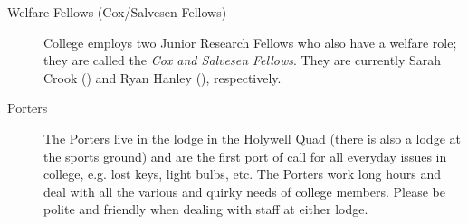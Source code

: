 \begin{description}
\item[Welfare Fellows (Cox/Salvesen Fellows)]
College employs two Junior Research Fellows who also have a welfare role; they
are called the \emph{Cox and Salvesen Fellows}. They are currently Sarah Crook (\href{mailto:sarah.crook@new.ox.ac.uk}{}) and Ryan Hanley (\href{mailto:ryan.hanley@new.ox.ac.uk}{}), respectively.


\item[Porters]
The Porters live in the lodge in the Holywell Quad (there is also a lodge at the sports ground) and are the first port of call for all everyday issues in college, e.g. lost keys, light bulbs, etc. The Porters work long hours and deal with all the various and quirky needs of college members. Please be polite and friendly when dealing with staff at either lodge.
\end{description}